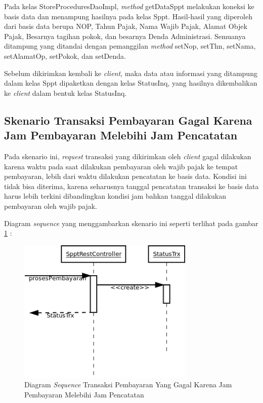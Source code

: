   Pada kelas StoreProceduresDaoImpl, \textit{method} getDataSppt melakukan koneksi ke basis data dan menampung hasilnya pada kelas Sppt. Hasil-hasil yang diperoleh dari basis data berupa NOP, Tahun Pajak, Nama Wajib Pajak, Alamat Objek Pajak, Besarnya tagihan pokok, dan besarnya Denda Administrasi. Semuanya ditampung yang ditandai dengan pemanggilan \textit{method} setNop, setThn, setNama, setAlamatOp, setPokok, dan setDenda.
  
  Sebelum dikirimkan kembali ke \textit{client}, maka data atau informasi yang ditampung dalam kelas Sppt dipaketkan dengan kelas StatusInq, yang hasilnya dikembalikan ke \textit{client} dalam bentuk kelas StatusInq.

\subsection{Skenario Transaksi Pembayaran Gagal Karena Jam Pembayaran Melebihi Jam Pencatatan}

Pada skenario ini, \textit{request} transaksi yang dikirimkan oleh \textit{client} gagal dilakukan karena waktu pada saat dilakukan pembayaran oleh wajib pajak ke tempat pembayaran, lebih dari waktu dilakukan pencatatan ke basis data. Kondisi ini tidak bisa diterima, karena seharusnya tanggal pencatatan transaksi ke basis data harus lebih terkini dibandingkan kondisi jam bahkan tanggal dilakukan pembayaran oleh wajib pajak.

Diagram \textit{sequence} yang menggambarkan skenario ini seperti terlihat pada gambar \ref{fig:uml-seq-trx-tgl-bayar-error} :

\begin{figure}[H]
  \centering
  \includegraphics[width=0.75\textwidth]{./resources/uml/uml-seq-trx-tgl-bayar-error}
  \caption{Diagram \textit{Sequence} Transaksi Pembayaran Yang Gagal Karena Jam Pembayaran Melebihi Jam Pencatatan}
  \label{fig:uml-seq-trx-tgl-bayar-error}
\end{figure}

